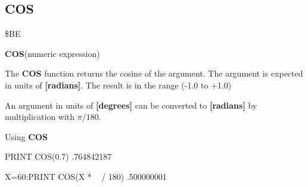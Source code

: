 
\newpage
\subsection{COS}
\begin{description}[leftmargin=3cm,style=nextline]
\item [Token:] \$BE
\item [Format:] {\bf COS}(numeric expression)
\item [Usage:] The {\bf COS} function returns the cosine of the
               argument.
               The argument is expected in units of {\bf [radians]}.
               The result is in the range (-1.0 to +1.0)

\item [Remarks:] An argument in units of {\bf [degrees]}
                 can be converted to {\bf [radians]}
               by multiplication with $\pi/180$.
\item [Example:] Using {\bf COS}
\begin{screenoutput}
  PRINT COS(0.7)
   .764842187

  X=60:PRINT COS(X * ~ / 180)
   .500000001
\end{screenoutput}
\end{description}


\newpage
